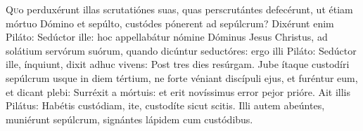 
\lettrine{Q}{u}o perduxérunt illas scrutatiónes suas, quas perscrutántes defecérunt, ut étiam mórtuo Dómino et sepúlto, custódes pónerent ad sepúlcrum? Dixérunt enim Piláto: Sedúctor ille: hoc appellabátur nómine Dóminus Jesus Christus, ad solátium servórum suórum, quando dicúntur seductóres: ergo illi Piláto: Sedúctor ille, ínquiunt, dixit adhuc vivens: Post tres dies resúrgam. Jube ítaque custodíri sepúlcrum usque in diem tértium, ne forte véniant discípuli ejus, et furéntur eum, et dicant plebi: Surréxit a mórtuis: et erit novíssimus error pejor prióre. Ait illis Pilátus: Habétis custódiam, ite, custodíte sicut scitis. Illi autem abeúntes, muniérunt sepúlcrum, signántes lápidem cum custódibus.